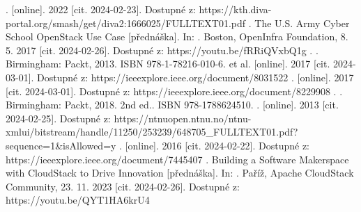 \documentclass[twoside, 12pt]{article}
\begin{document}
\begin{literatura}
{.  [online]. 2022 [cit. 2024-02-23]. Dostupné z: https://kth.diva-portal.org/smash/get/diva2:1666025/FULLTEXT01.pdf}
{. The U.S. Army Cyber School OpenStack Use Case [přednáška]. In: . Boston, OpenInfra Foundation, 8. 5. 2017 [cit. 2024-02-26]. Dostupné z: https://youtu.be/fRRiQVxbQ1g}
{. . Birmingham: Packt, 2013. ISBN 978-1-78216-010-6.}
{ et al.  [online]. 2017 [cit. 2024-03-01]. Dostupné z: https://ieeexplore.ieee.org/document/8031522}
{.  [online]. 2017 [cit. 2024-03-01]. Dostupné z: https://ieeexplore.ieee.org/document/8229908}
{. . Birmingham: Packt, 2018. 2nd ed.. ISBN 978-1788624510.}
{.  [online]. 2013 [cit. 2024-02-25]. Dostupné z: https://ntnuopen.ntnu.no/ntnu-xmlui/bitstream/handle/11250/253239/648705\_FULLTEXT01.pdf?sequence=1\&isAllowed=y}
{.  [online]. 2016 
[cit. 2024-02-22]. Dostupné z: https://ieeexplore.ieee.org/document/7445407}
{. Building a Software Makerspace with CloudStack to Drive Innovation [přednáška]. In: . Paříž, Apache CloudStack Community, 23. 11. 2023 [cit. 2024-02-26]. Dostupné z: https://youtu.be/QYT1HA6krU4}
\end{literatura}
\end{document}
